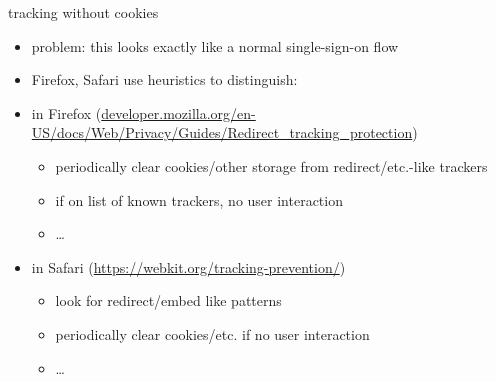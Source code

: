 \begin{frame}{tracking without cookies}
    \begin{itemize}
    \item problem: this looks exactly like a normal single-sign-on flow
    \vspace{.5cm}
    \item Firefox, Safari use heuristics to distinguish:
    \item in Firefox ({\scriptsize \url{developer.mozilla.org/en-US/docs/Web/Privacy/Guides/Redirect_tracking_protection}})
        \begin{itemize}
        \item periodically clear cookies/other storage from redirect/etc.-like trackers
        \item if on list of known trackers, no user interaction
        \item \ldots
        \end{itemize}
    \item in Safari ({\scriptsize \url{https://webkit.org/tracking-prevention/}})
        \begin{itemize}
        \item look for redirect/embed like patterns
        \item periodically clear cookies/etc. if no user interaction
        \item \ldots
        \end{itemize}
    \end{itemize}
\end{frame}
